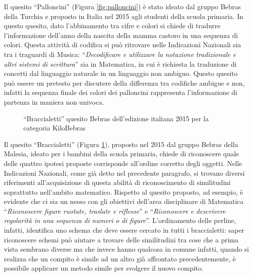 \documentclass[12pt]{report}
\begin{document}
Il quesito ``Palloncini'' (Figura \ref{fig:palloncini}) è stato ideato dal gruppo Bebras della Turchia e proposto in Italia nel 2015 agli studenti della scuola primaria. In questo quesito, dato l'abbinamento tra cifre e colori si chiede di tradurre l'informazione dell'anno della nascita della mamma castoro in una sequenza di colori. Questa attività di codifica si può ritrovare nelle Indicazioni Nazionali sia tra i traguardi di Musica: ``\textit{Decodificare e utilizzare la notazione tradizionale e altri sistemi di scrittura}'' sia in Matematica, in cui è richiesta la traduzione di concetti dal linguaggio naturale in un linguaggio non ambiguo. Questo quesito può essere un pretesto per discutere della differenza tra codifiche ambigue e non, infatti la sequenza finale dei colori dei palloncini rappresenta l'informazione di partenza in maniera non univoca.



\bigskip
\begin{figure}[h]
	\centering
	\caption{``Braccialetti'' quesito Bebras dell'edizione italiana 2015 per la categoria KiloBebras}\label{fig:braccialetti}
\end{figure}

Il quesito ``Braccialetti'' (Figura \ref{fig:braccialetti}), proposto nel 2015 dal gruppo Bebras della Malesia, ideato per i bambini della scuola primaria, chiede di riconoscere quale delle quattro ipotesi proposte corrisponde all'ordine corretto degli oggetti. Nelle Indicazioni Nazionali, come già detto nel precedente paragrafo, si trovano diversi riferimenti all'acquisizione di questa abilità di riconoscimento di similitudini soprattutto nell'ambito matematico. Rispetto al quesito proposto, ad esempio, è evidente che ci sia un nesso con gli obiettivi dell'area disciplinare di Matematica ``\textit{Riconoscere figure ruotate, traslate e riflesse}'' e ``\textit{Riconoscere e descrivere regolarità in una sequenza di numeri o di figure}''. L'ordinamento delle perline, infatti, identifica uno schema che deve essere cercato in tutti i braccialetti: saper riconoscere schemi può aiutare a trovare delle similitudini tra cose che a prima vista sembrano diverse ma che invece hanno qualcosa in comune infatti, quando si realizza che un compito è simile ad un altro già affrontato precedentemente, è possibile applicare un metodo simile per svolgere il nuovo
compito.
\end{document}
